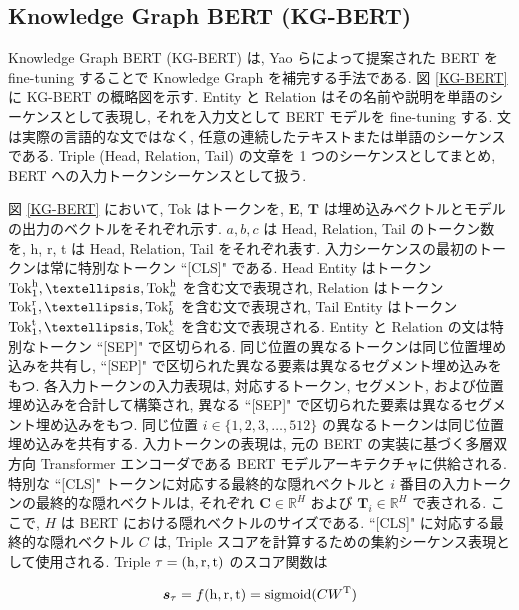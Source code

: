 \subsection{Knowledge Graph BERT (KG-BERT)}

Knowledge Graph BERT (KG-BERT) \cite{KG-BERT} は, Yao らによって提案された BERT を fine-tuning することで Knowledge Graph を補完する手法である. 図 \ref{KG-BERT} に KG-BERT の概略図を示す. Entity と Relation はその名前や説明を単語のシーケンスとして表現し, それを入力文として BERT モデルを fine-tuning する. 文は実際の言語的な文ではなく, 任意の連続したテキストまたは単語のシーケンスである. Triple (Head, Relation, Tail) の文章を 1 つのシーケンスとしてまとめ, BERT への入力トークンシーケンスとして扱う. \par
図 \ref{KG-BERT} において, Tok はトークンを, $\bm{E}$, $\bm{T}$ は埋め込みベクトルとモデルの出力のベクトルをそれぞれ示す. $a, b, c$ は Head, Relation, Tail のトークン数を, h, r, t は Head, Relation, Tail をそれぞれ表す. 入力シーケンスの最初のトークンは常に特別なトークン ``[CLS]" である. Head Entity はトークン ${\rm Tok}_{1}^{\rm h}, …,{\rm Tok}_{a}^{\rm h}$ を含む文で表現され, Relation はトークン ${\rm Tok}_{1}^{\rm r}, …,{\rm Tok}_{b}^{\rm r}$ を含む文で表現され, Tail Entity はトークン ${\rm Tok}_{1}^{\rm t}, …,{\rm Tok}_{c}^{\rm t}$ を含む文で表現される. Entity と Relation の文は特別なトークン ``[SEP]" で区切られる. 同じ位置の異なるトークンは同じ位置埋め込みを共有し, ``[SEP]" で区切られた異なる要素は異なるセグメント埋め込みをもつ. 各入力トークンの入力表現は, 対応するトークン, セグメント, および位置埋め込みを合計して構築され, 異なる ``[SEP]" で区切られた要素は異なるセグメント埋め込みをもつ. 同じ位置 $i \in \{1, 2, 3, …, 512\}$ の異なるトークンは同じ位置埋め込みを共有する. 入力トークンの表現は, 元の BERT の実装に基づく多層双方向 Transformer エンコーダである BERT モデルアーキテクチャに供給される. 特別な ``[CLS]" トークンに対応する最終的な隠れベクトルと $i$ 番目の入力トークンの最終的な隠れベクトルは, それぞれ $\bm{C} \in \mathbb{R}^{H} $ および $\bm{T}_{i} \in \mathbb{R}^{H}$ で表される. ここで, $H$ は BERT における隠れベクトルのサイズである. ``[CLS]" に対応する最終的な隠れベクトル $C$ は, Triple スコアを計算するための集約シーケンス表現として使用される. Triple ${\rm \tau} = ({\rm h}, {\rm r}, {\rm t})$ のスコア関数は

\begin{equation}
\bm{s}_{\rm \tau} = f({\rm h}, {\rm r}, {\rm t}) = {\rm sigmoid}(CW^{\rm T})
\end{equation}

